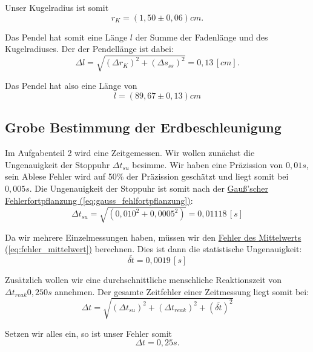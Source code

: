 Unser Kugelradius ist somit 
\begin{equation}
    \boxed{
        r_K = (1,50 \pm 0,06)cm.
    }
\end{equation}

Das Pendel hat somit eine Länge $l$ der Summe der Fadenlänge und des Kugelradiuses. Der der Pendellänge ist dabei:
\begin{equation}
    \Delta l = \sqrt{(\Delta r_K)^2 + (\Delta s_{ss})^2} = 0,13 \, [cm].
\end{equation} 

Das Pendel hat also eine Länge von
\begin{equation}
\boxed{
    l = (89,67 \pm 0,13)cm
}
\end{equation}


\subsection*{Grobe Bestimmung der Erdbeschleunigung}
Im Aufgabenteil 2 wird eine Zeitgemessen. Wir wollen zunächst die Ungenauigkeit der Stoppuhr $\Delta t_{su}$ besimme. Wir haben eine Präzission von $0,01s$, sein Ablese Fehler wird auf 50\% der Präzission geschätzt und liegt somit bei $0,005s$. Die Ungenauigkeit der Stoppuhr ist somit nach der \hyperref[eq:gauss_fehlfortpflanzung]{Gauß'scher Fehlerfortpflanzung (\ref*{eq:gauss_fehlfortpflanzung})}:
\begin{equation}
    \Delta t_{su} = \sqrt{(0,010^2 + 0,0005^2)} = 0,01118 \, [s]
\end{equation}

Da wir mehrere Einzelmessungen haben, müssen wir den \hyperref[eq:fehler_mittelwert]{Fehler des Mittelwerts (\ref*{eq:fehler_mittelwert})} berechnen. Dies ist dann die statistische Ungenauigkeit:
\begin{equation}
    \overline{\delta t} = 0,0019 \, [s]
\end{equation}

Zusätzlich wollen wir eine durchschnittliche menschliche Reaktionszeit von $\Delta t_{reak} 0,250s$ annehmen. Der gesamte Zeitfehler einer Zeitmessung liegt somit bei:
\begin{equation}
    \Delta t = \sqrt{(\Delta t_{su})^2+ (\Delta t_{reak})^2 + (\overline{\delta t})^2}
    \label{eq:f_zeit}
\end{equation}

Setzen wir alles ein, so ist unser Fehler somit
\begin{equation}
    \Delta t = 0,25 s.
\end{equation}

